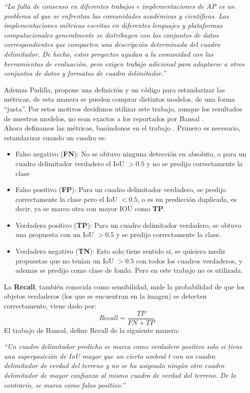 \begin{center}
	 \textit{``La falta de consenso en diferentes trabajos e implementaciones de AP es un problema al que se enfrentan las comunidades académicas y científicas. Las implementaciones métricas escritas en diferentes lenguajes y plataformas computacionales generalmente se distribuyen con los conjuntos de datos correspondientes que comparten una descripción determinada del cuadro delimitador. De hecho, estos proyectos ayudan a la comunidad con las herramientas de evaluación, pero exigen trabajo adicional para adaptarse a otros conjuntos de datos y formatos de cuadro delimitador.''}\\
\end{center}

Ademas Padilla, propone una definición y un código para estandarizar las métricas, de esta manera se pueden comprar distintos modelos, de una forma ``justa''. Por estos motivos decidimos utilizar este trabajo, aunque los resultados de nuestros modelos, no sean exactos a los reportados por Bansal \cite{bansal2018zero}.\\

Ahora definamos las métricas, basándonos en el trabajo \cite{padilla2020survey}. Primero es necesario, estandarizar cuando un cuadro es:
\begin{itemize}
	\item Falso negativo (\textbf{FN}): No se obtuvo ninguna detección en absoluto, o para un cuadro delimitador verdadero el IoU $> 0.5$ y no se predijo correctamente la clase
	\item Falso positivo (\textbf{FP}): Para un cuadro delimitador verdadero, se predijo correctamente la clase pero el IoU $< 0.5$, o es un predicción duplicada, es decir, ya se marco otra con mayor IOU como \textbf{TP}.
	\item Verdadero positivo (\textbf{TP}): Para un cuadro delimitador verdadero, se obtuvo  una propuesta con un IoU $> 0.5$ y se predijo correctamente la clase.
	\item Verdadero negativo (\textbf{TN}): Esto solo tiene sentido si, se quisiera medir propuestas que no tenían un IoU $> 0.5$ con todos los cuadros verdaderos, y ademas se predijo como clase de fondo. Pero en este trabajo no es utilizada.
\end{itemize}


La \textbf{Recall}, también conocida como sensibilidad, mide la probabilidad de que los objetos verdaderos (los que se encuentran en la imagen) se detecten correctamente, viene dado por: \[Recall =\frac{TP}{FN+TP}\] El trabajo de Bansal, define Recall de la siguiente manera: 
\begin{center}
	\textit{``Un cuadro delimitador predicho se marca como verdadero positivo solo si tiene una superposición de IoU mayor que un cierto umbral t con un cuadro delimitador de verdad del terreno y no se ha asignado ningún otro cuadro delimitador de mayor confianza al mismo cuadro de verdad del terreno. De lo contrario, se marca como falso positivo.''}\\
\end{center}


